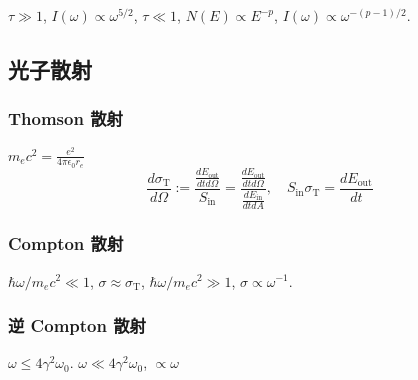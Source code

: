$\tau\gg 1$, $I(\omega)\propto\omega^{5/2}$, $\tau\ll 1$, $N(E)\propto E^{-p}$, $I(\omega)\propto \omega^{-(p-1)/2}$.

\subsection{光子散射}

\subsubsection{Thomson 散射}

   $m_ec^2 = \frac{e^2}{4\pi\epsilon_0 r_e}$
\begin{equation}
    \frac{d \sigma_\text{T}}{d \Omega}:=\frac{\frac{d E_\text{out}}{dt d\Omega}}{S_\text{in}}=\frac{\frac{d E_\text{out}}{dt d\Omega}}{\frac{d E_\text{in}}{dt dA}},\quad S_\text{in}\sigma_\text{T}=\frac{d E_\text{out}}{dt}
\end{equation}

\subsubsection{Compton 散射}

$\hbar\omega/m_ec^2\ll1$, $\sigma\approx\sigma_\text{T}$, $\hbar\omega/m_ec^2\gg1$, $\sigma\propto\omega^{-1}$.

\subsubsection{逆 Compton 散射}

$\omega\le 4\gamma^2\omega_0$. $\omega\ll 4\gamma^2\omega_0$, $\propto\omega$
